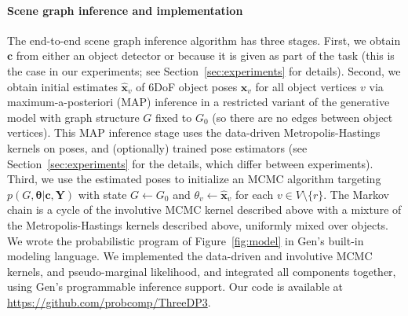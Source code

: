 \paragraph{Scene graph inference and implementation}
The end-to-end scene graph inference algorithm has three stages.
First, we obtain $\mathbf{c}$ from either an object detector or because it is given as part of the task (this is the case in our experiments; see Section~\ref{sec:experiments} for details).
Second, we obtain initial estimates $\hat{\mathbf{x}}_v$ of 6DoF object poses $\mathbf{x}_v$ for all object vertices $v$ via maximum-a-posteriori (MAP) inference in a restricted variant of the generative model with graph structure $G$ fixed to $G_0$ (so there are no edges between object vertices).
This MAP inference stage uses the data-driven Metropolis-Hastings kernels on poses, and (optionally) trained pose estimators (see Section~\ref{sec:experiments} for the details, which differ between experiments).
Third, we use the estimated poses to initialize an MCMC algorithm targeting $p(G, \bm{\theta} | \mathbf{c}, \mathbf{Y})$ with state $G \gets G_0$ and $\theta_v \gets \hat{\mathbf{x}}_v$ for each $v \in V \setminus \{r\}$.
The Markov chain is a cycle of the involutive MCMC kernel described above with a mixture of the Metropolis-Hastings kernels described above, uniformly mixed over objects.
We wrote the probabilistic program of Figure~\ref{fig:model} in Gen's built-in modeling language.
We implemented the data-driven and involutive MCMC kernels, and pseudo-marginal likelihood,
and integrated all components together, using Gen's programmable inference support.
Our code is available at \url{https://github.com/probcomp/ThreeDP3}.

